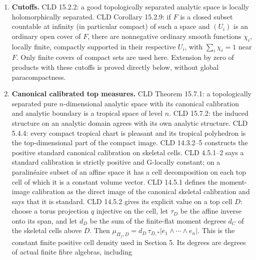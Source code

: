 \documentclass[
  11pt,
]{article}
\begin{document}
\begin{enumerate}
  operations (CLD 3.3.12). CLD Proposition 3.4.4 states: for a
  G-tropical chart \(f:X\to V\), a coefficient form \(\eta\) has zero
  pullback in the G-form sheaf if and only if its restriction to
  \(f(W)\) is zero for every compact domain \(W\) of \(X\). Proposition
  3.4.1 is the compact-chart presheaf version. We use actual compact
  images to prove the tripod one-form identity. Its moment and
  coefficients are ordinary, so its equality in the containing G-sheaf
  is an equality of ordinary forms.
\item
  \textbf{Cutoffs.} CLD 15.2.2: a good topologically separated analytic
  space is locally holomorphically separated. CLD Corollary 15.2.9: if
  \(F\) is a closed subset countable at infinity (in particular compact)
  of such a space and \((U_i)\) is an ordinary open cover of \(F\),
  there are nonnegative ordinary smooth functions \(\chi_i\), locally
  finite, compactly supported in their respective \(U_i\), with
  \(\sum_i\chi_i=1\) near \(F\). Only finite covers of compact sets are
  used here. Extension by zero of products with these cutoffs is proved
  directly below, without global paracompactness.
\item
  \textbf{Canonical calibrated top measures.} CLD Theorem 15.7.1: a
  topologically separated pure \(n\)-dimensional analytic space with its
  canonical calibration and analytic boundary is a tropical space of
  level \(n\). CLD 15.7.2: the induced structure on an analytic domain
  agrees with its own analytic structure. CLD 5.4.4: every compact
  tropical chart is pleasant and its tropical polyhedron is the
  top-dimensional part of the compact image. CLD 14.3.2--5 constructs
  the positive standard canonical calibration on skeletal cells. CLD
  4.5.1--2 says a standard calibration is strictly positive and
  G-locally constant; on a paralinéaire subset of an affine space it has
  a cell decomposition on each top cell of which it is a constant volume
  vector. CLD 14.5.1 defines the moment-image calibration as the direct
  image of the canonical skeletal calibration and says that it is
  standard. CLD 14.5.2 gives its explicit value on a top cell \(D\):
  choose a torus projection \(q\) injective on the cell, let \(\tau_D\)
  be the affine inverse onto its span, and let \(d_D\) be the sum of the
  finite-flat moment degrees \(d_C\) of the skeletal cells above \(D\).
  Then \(\mu_{\Pi_f,D}=d_D\,\tau_{D,*}|e_1\wedge\cdots\wedge e_n|\).
  This is the constant finite positive cell density used in Section 5.
  Its degrees are degrees of actual finite fibre algebras, including

\end{enumerate}
\end{document}
